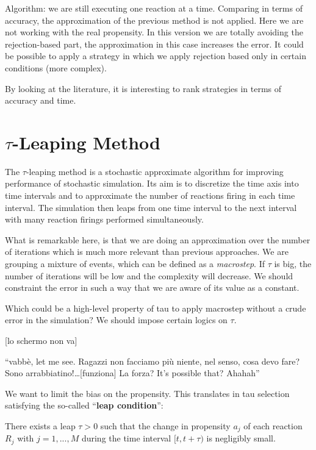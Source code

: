Algorithm: we are still executing one reaction at a time. Comparing in
terms of accuracy, the approximation of the previous method is not
applied. Here we are not working with the real propensity. In this
version we are totally avoiding the rejection-based part, the
approximation in this case increases the error. It could be possible to
apply a strategy in which we apply rejection based only in certain
conditions (more complex).

By looking at the literature, it is interesting to rank strategies in
terms of accuracy and time.

\hypertarget{tau-leaping-method}{%
\section{\texorpdfstring{$\tau$-Leaping
Method}{-Leaping Method}}\label{tau-leaping-method}}

The $\tau$-leaping method is a stochastic approximate algorithm for
improving performance of stochastic simulation. Its aim is to discretize
the time axis into time intervals and to approximate the number of
reactions firing in each time interval. The simulation then leaps from
one time interval to the next interval with many reaction firings
performed simultaneously.

What is remarkable here, is that we are doing an approximation over the
number of iterations which is much more relevant than previous
approaches. We are grouping a mixture of events, which can be defined as
a \emph{macrostep}. If $\tau$ is big, the number of iterations will be
low and the complexity will decrease. We should constraint the error in
such a way that we are aware of its value as a constant.

Which could be a high-level property of tau to apply macrostep without a
crude error in the simulation? We should impose certain logics on $\tau$.

{[}lo schermo non va{]}

``vabbè, let me see. Ragazzi non facciamo più niente, nel senso, cosa
devo fare?Sono arrabbiatino!\ldots{[}funziona{]} La forza? It's possible
that? Ahahah''

We want to limit the bias on the propensity. This translates in tau
selection satisfying the so-called ``\textbf{leap condition}'':

There exists a leap $\tau > 0$ such that the change in propensity $a_j$ of
each reaction $R_j$ with $j = 1,...,M$ during the time interval
$[t,t +\tau)$ is negligibly small.

